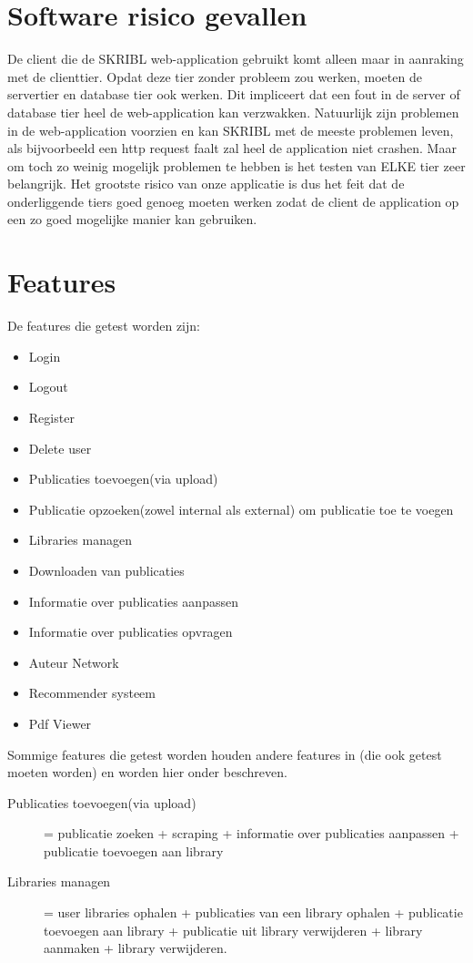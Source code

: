 \documentclass{article}
\begin{document}
\section{Software risico gevallen}
De client die de SKRIBL web-application gebruikt komt alleen maar in aanraking met de clienttier. Opdat deze tier zonder probleem zou werken, moeten de servertier en database tier ook werken. Dit impliceert dat een fout in de server of database tier heel de web-application kan verzwakken. Natuurlijk zijn problemen in de web-application voorzien en kan SKRIBL met de meeste problemen leven, als bijvoorbeeld een http request faalt zal heel de application niet crashen. Maar om toch zo weinig mogelijk problemen te hebben is het testen  van ELKE tier zeer belangrijk. Het grootste risico van onze applicatie is dus het feit dat de onderliggende tiers goed genoeg moeten werken zodat de client de application op een zo goed mogelijke manier kan gebruiken.
%
\section{Features}
De features die getest worden zijn:
\begin{itemize}
  \item Login 
  \item Logout 
  \item Register
  \item Delete user
  \item Publicaties toevoegen(via upload)
  \item Publicatie opzoeken(zowel internal als external) om publicatie toe te voegen
  \item Libraries managen
  \item Downloaden van publicaties
  \item Informatie over publicaties aanpassen
  \item Informatie over publicaties opvragen
  \item Auteur Network
  \item Recommender systeem
  \item Pdf Viewer
\end{itemize}
Sommige features die getest worden houden andere features in (die ook getest moeten worden) en worden hier onder beschreven.\\
\begin{description}
\item[Publicaties toevoegen(via upload)] = publicatie zoeken + scraping + informatie over publicaties aanpassen + publicatie toevoegen aan library
\item[Libraries managen] = user libraries ophalen + publicaties van een library ophalen + publicatie toevoegen aan library + publicatie uit library verwijderen + library aanmaken + library verwijderen.
\end{description}
%
\end{document}
